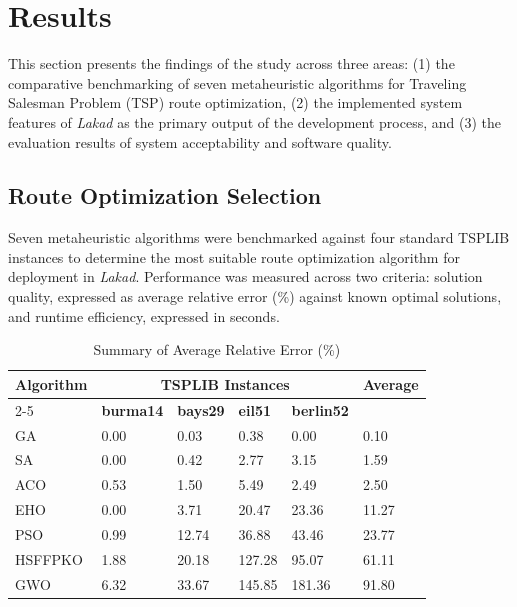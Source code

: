 \section{Results}

This section presents the findings of the study across three areas:
(1) the comparative benchmarking of seven metaheuristic algorithms for
Traveling Salesman Problem (TSP) route optimization, (2) the implemented
system features of \textit{Lakad} as the primary output of the development process,
and (3) the evaluation results of system acceptability and software quality.

\subsection{Route Optimization Selection}

Seven metaheuristic algorithms were benchmarked against four standard
TSPLIB instances to determine the most suitable route optimization
algorithm for deployment in \textit{Lakad}. Performance was measured across two
criteria: solution quality, expressed as average relative error (\%)
against known optimal solutions, and runtime efficiency, expressed in
seconds.
 
 
\begin{table}[H]
    \centering
    \singlespacing
    \caption{Summary of Average Relative Error (\%)}
    \label{tab:acc}
    \renewcommand{\arraystretch}{1.2}
    \begin{tabularx}{\linewidth}{XXXXXX}
        \toprule
        \multirow{2}{*}{\textbf{Algorithm}} &
        \multicolumn{4}{c}{\textbf{TSPLIB Instances}} &
        \multirow{2}{*}{\textbf{Average}} \\
        \cmidrule(lr){2-5}
         & \textbf{burma14} & \textbf{bays29} & \textbf{eil51} &
           \textbf{berlin52} & \\
        \midrule
        GA      & 0.00 & 0.03  & 0.38   & 0.00   & 0.10  \\
        SA      & 0.00 & 0.42  & 2.77   & 3.15   & 1.59  \\
        ACO     & 0.53 & 1.50  & 5.49   & 2.49   & 2.50  \\
        EHO     & 0.00 & 3.71  & 20.47  & 23.36  & 11.27 \\
        PSO     & 0.99 & 12.74 & 36.88  & 43.46  & 23.77 \\
        HSFFPKO & 1.88 & 20.18 & 127.28 & 95.07  & 61.11 \\
        GWO     & 6.32 & 33.67 & 145.85 & 181.36 & 91.80 \\
        \bottomrule
    \end{tabularx}
\end{table}
 
